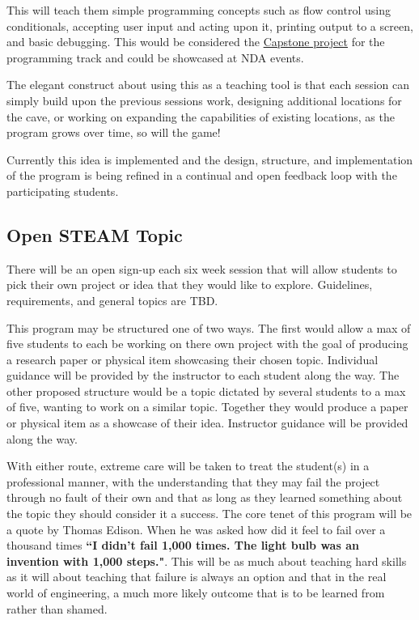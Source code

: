 \documentclass{article}
\begin{document}
This will teach them simple programming concepts such as flow control using conditionals, accepting user input and acting upon it, printing output to a screen, and basic debugging. This would be considered the \href{http://edglossary.org/capstone-project/}{Capstone project} for the programming track and could be showcased at NDA events. 

The elegant construct about using this as a teaching tool is that each session can simply build upon the previous sessions work, designing additional locations for the cave, or working on expanding the capabilities of existing locations, as the program grows over time, so will the game!

Currently this idea is implemented and the design, structure, and implementation of the program is being refined in a continual and open feedback loop with the participating students.

\subsection*{Open STEAM Topic}
There will be an open sign-up each six week session that will allow students to pick their own project or idea that they would like to explore. Guidelines, requirements, and general topics are TBD. 

This program may be structured one of two ways. The first would allow a max of five students to each be working on there own project with the goal of producing a research paper or physical item showcasing their chosen topic. Individual guidance will be provided by the instructor to each student along the way. The other proposed structure would be a topic dictated by several students to a max of five, wanting to work on a similar topic. Together they would produce a paper or physical item as a showcase of their idea. Instructor guidance will be provided along the way.

With either route, extreme care will be taken to treat the student(s) in a professional manner, with the understanding that they may fail the project through no fault of their own and that as long as they learned something about the topic they should consider it a success. The core tenet of this program will be a quote by Thomas Edison. When he was asked how did it feel to fail over a thousand times \textbf{``I didn’t fail 1,000 times. The light bulb was an invention with 1,000 steps."}. This will be as much about teaching hard skills as it will about teaching that failure is always an option and that in the real world of engineering, a much more likely outcome that is to be learned from rather than shamed.
\end{document}
